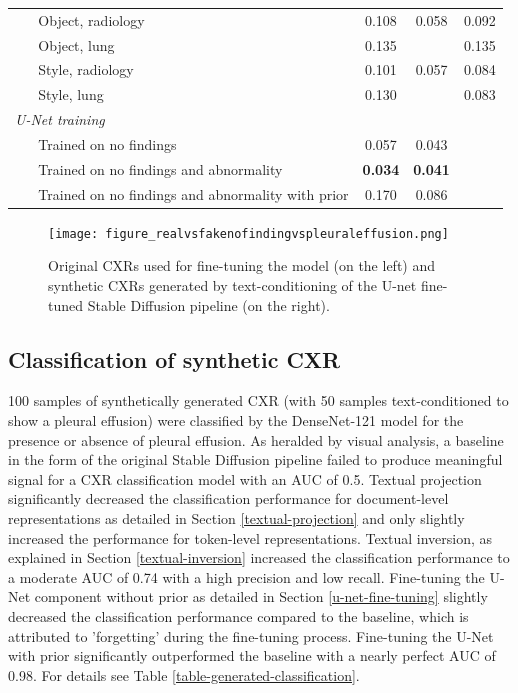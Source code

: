 \documentclass{article}
\begin{document}
\begin{table}[bt!]
{\begin{tabular}{lccc}
~ ~ Object, radiology
& 0.108
& 0.058
& 0.092
\\
~ ~ Object, lung
& 0.135
& 
& 0.135
\\
~ ~ Style, radiology
& 0.101
& 0.057
& 0.084
\\
~ ~ Style, lung
& 0.130
& 
& 0.083
\\
\midrule
\textit{U-Net training}
&
&
&
\\
~ ~ Trained on no findings
& 0.057
& 0.043
& 
\\
~ ~ Trained on no findings and abnormality
& \textbf{0.034}
& \textbf{0.041}
&
\\
~ ~ Trained on no findings and abnormality with prior
& 0.170
& 0.086
& 
\\
\bottomrule
\end{tabular}
}
\end{table}


\begin{figure}
  \centering
    \texttt{[image: figure\_realvsfakenofindingvspleuraleffusion.png]}
  \caption{Original CXRs used for fine-tuning the model (on the left) and synthetic CXRs generated by text-conditioning of the U-net fine-tuned Stable Diffusion pipeline (on the right).}
  \label{figure-realvsgeneratedgallery}
\end{figure}



\subsection{Classification of synthetic CXR}

100 samples of synthetically generated CXR (with 50 samples text-conditioned to show a pleural effusion) were classified by the DenseNet-121 model for the presence or absence of pleural effusion. As heralded by visual analysis, a baseline in the form of the original Stable Diffusion pipeline failed to produce meaningful signal for a CXR classification model with an AUC of 0.5. Textual projection significantly decreased the classification performance for document-level representations as detailed in Section \ref{textual-projection} and only slightly increased the performance for token-level representations. Textual inversion, as explained in Section \ref{textual-inversion} increased the classification performance to a moderate AUC of 0.74 with a high precision and low recall. Fine-tuning the U-Net component without prior as detailed in Section \ref{u-net-fine-tuning} slightly decreased the classification performance compared to the baseline, which is attributed to 'forgetting' during the fine-tuning process. Fine-tuning the U-Net with prior significantly outperformed the baseline with a nearly perfect AUC of 0.98. For details see Table \ref{table-generated-classification}.
\end{document}

